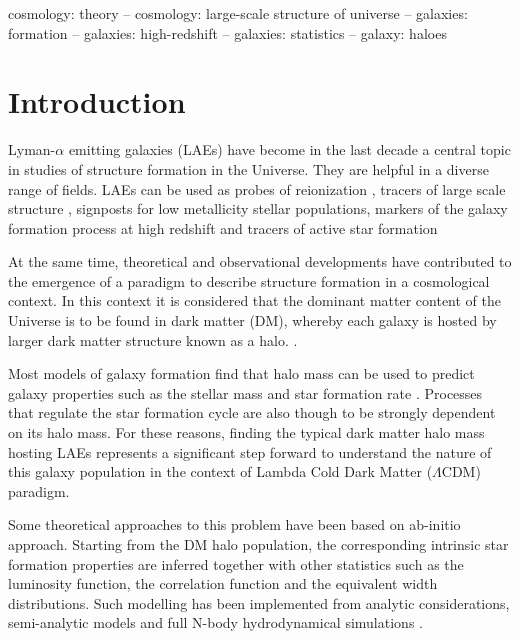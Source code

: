 \documentclass[usenatbib]{mn2e}
\begin{document}
\begin{keywords}
{cosmology: theory – cosmology: large-scale structure of universe –
  galaxies: formation – galaxies: high-redshift – galaxies: statistics
  – galaxy: haloes} 
\end{keywords}


\section{Introduction}

Lyman-$\alpha$ emitting galaxies (LAEs) have become in the last decade
a  central topic in studies of structure formation in the Universe. They 
are helpful in a diverse range of fields. LAEs can be used as probes
of reionization \citep{Dijkstra11}, tracers of large scale structure
\citep{Koehler2007},  signposts for low metallicity stellar
populations, markers of the galaxy formation process at high redshift
\citep{Dayal2009,ForeroRomero2012} and tracers of active star formation
\citep{Guaita2013} 

At the same time, theoretical and observational developments have
contributed to the emergence of a paradigm to describe structure
formation in a cosmological context. In this context it is considered
that the dominant matter content of the Universe is to be found in dark
matter (DM), whereby each galaxy is hosted by larger dark matter structure
known as a halo. \citep{Peebles1980,SpringelNature05}.

Most models of galaxy formation find that halo mass can be
used to predict galaxy properties such as the stellar mass and
star formation rate \citep{Behroozi2013a}. Processes that regulate the
star formation cycle are also though to be strongly dependent on its
halo mass.  For these reasons, finding the typical dark matter halo mass
hosting LAEs represents a significant step forward to understand the
nature of this galaxy population in the context of Lambda Cold Dark
Matter ($\Lambda$CDM) paradigm.    

Some theoretical approaches to this problem have been based on
ab-initio approach. Starting from the DM halo population, the
corresponding intrinsic star formation properties are inferred
together with other statistics such as the luminosity function, the
correlation function and the equivalent width distributions. Such
modelling has been implemented from analytic considerations,
semi-analytic models \citep{Garel2012, Orsi2012}and  full N-body
hydrodynamical simulations \citep{Laursen2007, Dayal2009,
  ForeroRomero2011, Yajima2012, Soler2012}.   
\end{document}
